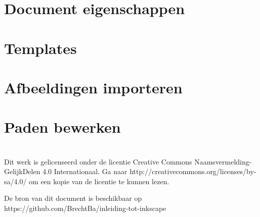 \documentclass[t]{beamer}
\begin{document}
	\section{Document eigenschappen}



	\section{Templates}



	\section{Afbeeldingen importeren}



	\section{Paden bewerken}


	\section*{}
	\begin{frame}
		\footnotesize
		\vspace{4cm}
    	Dit werk is gelicenseerd onder de licentie Creative Commons Naamsvermelding-GelijkDelen 4.0 Internationaal. Ga naar http://creativecommons.org/licenses/by-sa/4.0/ om een kopie van de licentie te kunnen lezen.
    	
    	\vspace{0.5cm}
    	De bron van dit document is beschikbaar op https://github.com/BrechtBa/inleiding-tot-inkscape
	\end{frame}	
	
\end{document}
